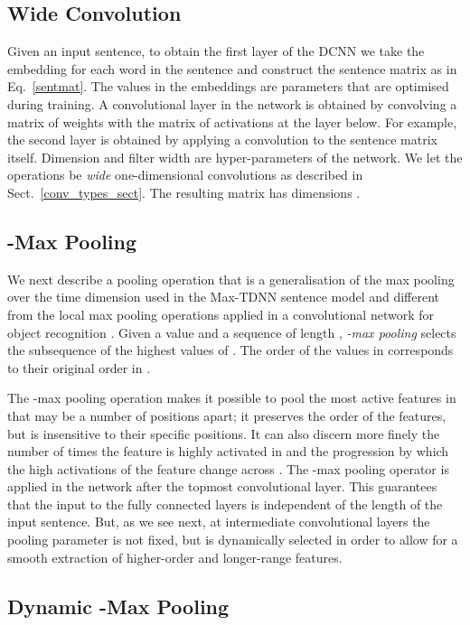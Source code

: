 \documentclass[11pt]{article}
\begin{document}
\subsection{Wide Convolution}

Given an input sentence, to obtain the first layer of the DCNN we take the embedding  for each word in the sentence and construct the sentence matrix  as in Eq.~\ref{sentmat}. The values in the embeddings  are parameters that are optimised during training. 
A convolutional layer in the network is obtained by convolving a matrix of weights  with the matrix of activations at the layer below. For example, the second layer is obtained by applying a convolution to the sentence matrix  itself.  Dimension  and filter width  are hyper-parameters of the network. We let the operations be \emph{wide} one-dimensional convolutions as described in Sect.~\ref{conv_types_sect}. The resulting matrix  has dimensions . 

\subsection{-Max Pooling}
\label{kmax}
We next describe a pooling operation that is a generalisation of the max pooling over the time dimension used in the Max-TDNN sentence model and different from the local max pooling operations applied in a convolutional network for object recognition \cite{lecun-98}. Given a value  and a sequence   of length , \emph{-max pooling} selects the subsequence  of the  highest values of . The order of the values in   corresponds to their original order in . 

The -max pooling operation makes it possible to pool the  most active features in  that may be a number of positions apart; it preserves the order of the features, but is insensitive to their specific positions. It can also discern more finely the number of times the feature is highly activated in  and the progression by which the high activations of the feature change across . 
The -max pooling operator is applied in the network after the topmost convolutional layer. This guarantees that the input to the fully connected layers is independent of the length of the input sentence.
But, as we see next, at intermediate convolutional layers the pooling parameter  is not fixed, but is dynamically selected in order to allow for a smooth extraction of higher-order and longer-range features. 
 

\subsection{Dynamic -Max Pooling}
\end{document}
